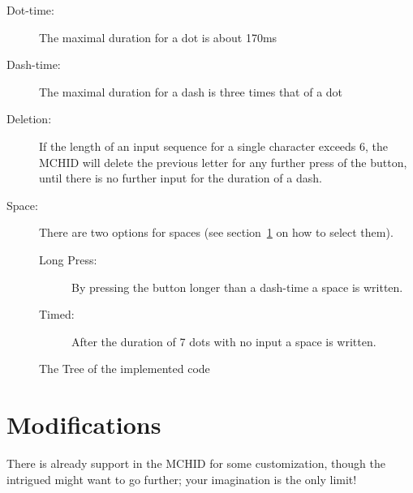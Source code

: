 \documentclass[a5paper,12pt]{article}
\begin{document}
    \begin{description}

        \item[Dot-time:] The maximal duration for a dot is about 170ms
        \item[Dash-time:] The maximal duration for a dash is three times that of a dot
        \item[Deletion:] If the length of an input sequence for a single character exceeds 6, the MCHID will delete the previous letter for any further press of the button, until there is no further input for the duration of a dash.
        \item[Space:] There are two options for spaces (see section~\ref{modifications} on how to select them).
            \begin{description}
            \item[Long Press:] By pressing the button longer than a dash-time a space is written.
            \item[Timed:] After the duration of 7 dots with no input a space is written.
            \end{description}
    \end{description}
            
    \begin{center}
    \label{morseTree}
    \begin{figure}
    
        \caption{The Tree of the implemented code}
        \label{fig:morseTree}
    \end{figure}
    \end{center}
    \section{Modifications}\label{modifications}
    There is already support in the MCHID for some customization, though the intrigued might want to go further; your imagination is the only limit!
\end{document}

